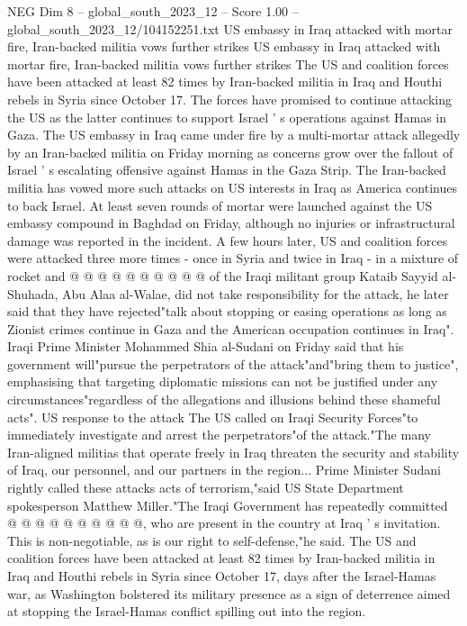 \begin{textsample}{NEG Dim 8 – global\_south\_2023\_12 – Score 1.00 – global\_south\_2023\_12/104152251.txt}  \label{ex:f8_neg_230}
US embassy in Iraq attacked with mortar fire, Iran-backed militia vows further strikes US embassy in Iraq attacked with mortar fire, Iran-backed militia vows further strikes The US and coalition forces have been attacked at least 82 times by Iran-backed militia in Iraq and Houthi rebels in Syria since October 17.
The forces have promised to continue attacking the US as the latter continues to support Israel ' s operations against Hamas in Gaza.
The US embassy in Iraq came under fire by a multi-mortar attack allegedly by an Iran-backed militia on Friday morning as concerns grow over the fallout of Israel ' s escalating offensive against Hamas in the Gaza Strip.
The Iran-backed militia has vowed more such attacks on US interests in Iraq as America continues to back Israel.
At least seven rounds of mortar were launched against the US embassy compound in Baghdad on Friday, although no injuries or infrastructural damage was reported in the incident.
A few hours later, US and coalition forces were attacked three more times - once in Syria and twice in Iraq - in a mixture of rocket and @ @ @ @ @ @ @ @ @ @ of the Iraqi militant group Kataib Sayyid al-Shuhada, Abu Alaa al-Walae, did not take responsibility for the attack, he later said that they have rejected"talk about stopping or easing operations as long as Zionist crimes continue in Gaza and the American occupation continues in Iraq".
Iraqi Prime Minister Mohammed Shia al-Sudani on Friday said that his government will"pursue the perpetrators of the attack"and"bring them to justice", emphasising that targeting diplomatic missions can not be justified under any circumstances"regardless of the allegations and illusions behind these shameful acts".
US response to the attack The US called on Iraqi Security Forces"to immediately investigate and arrest the perpetrators"of the attack."The many Iran-aligned militias that operate freely in Iraq threaten the security and stability of Iraq, our personnel, and our partners in the region...
Prime Minister Sudani rightly called these attacks acts of terrorism,"said US State Department spokesperson Matthew Miller."The Iraqi Government has repeatedly committed @ @ @ @ @ @ @ @ @ @, who are present in the country at Iraq ' s invitation.
This is non-negotiable, as is our right to self-defense,"he said.
The US and coalition forces have been attacked at least 82 times by Iran-backed militia in Iraq and Houthi rebels in Syria since October 17, days after the Israel-Hamas war, as Washington bolstered its military presence as a sign of deterrence aimed at stopping the Israel-Hamas conflict spilling out into the region.

\end{textsample}
